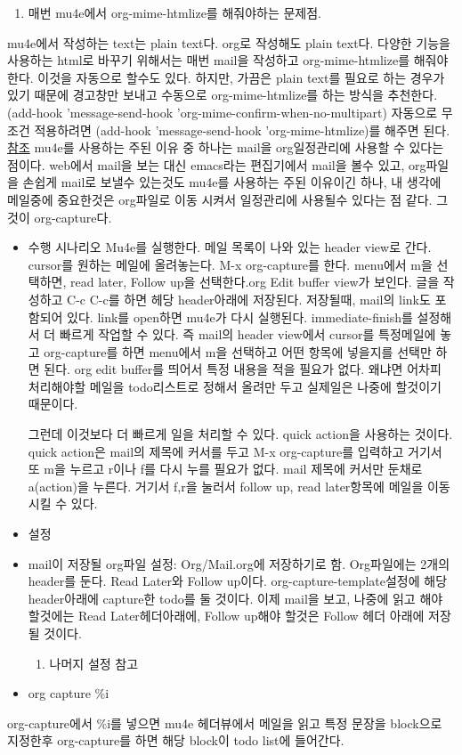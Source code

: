 \documentclass[11pt]{article}
\begin{document}
\begin{enumerate}
\item 매번 mu4e에서 org-mime-htmlize를 해줘야하는 문제점.
\end{enumerate}
mu4e에서 작성하는 text는 plain text다. org로 작성해도 plain
text다. 다양한 기능을 사용하는 html로 바꾸기 위해서는 매번 mail을
작성하고 org-mime-htmlize를 해줘야한다. 이것을 자동으로 할수도
있다. 하지만, 가끔은 plain text를 필요로 하는 경우가 있기 때문에
경고창만 보내고 수동으로 org-mime-htmlize를 하는 방식을 추천한다.
(add-hook 'message-send-hook 'org-mime-confirm-when-no-multipart)
자동으로 무조건 적용하려면 (add-hook 'message-send-hook
'org-mime-htmlize)를 해주면 된다.
\href{https://github.com/daviwil/emacs-from-scratch/blob/master/show-notes/Emacs-Mail-05.org}{참조} mu4e를 사용하는 주된 이유 중 하나는 mail을 org일정관리에 사용할
수 있다는 점이다. web에서 mail을 보는 대신 emacs라는 편집기에서 mail을
볼수 있고, org파일을 손쉽게 mail로 보낼수 있는것도 mu4e를 사용하는
주된 이유이긴 하나, 내 생각에 메일중에 중요한것은 org파일로 이동
시켜서 일정관리에 사용될수 있다는 점 같다. 그것이 org-capture다.

\begin{itemize}
\item 수행 시나리오 Mu4e를 실행한다. 메일 목록이 나와 있는 header view로
간다. cursor를 원하는 메일에 올려놓는다. M-x org-capture를
한다. menu에서 m을 선택하면, read later, Follow up을 선택한다.org
Edit buffer view가 보인다. 글을 작성하고 C-c C-c를 하면 헤당
header아래에 저장된다. 저장될때, mail의 link도 포함되어 있다. link를
open하면 mu4e가 다시 실행된다.  immediate-finish를 설정해서 더
빠르게 작업할 수 있다. 즉 mail의 header view에서 cursor를 특정메일에
놓고 org-capture를 하면 menu에서 m을 선택하고 어떤 항목에 넣을지를
선택만 하면 된다. org edit buffer를 띄어서 특정 내용을 적을 필요가
없다. 왜냐면 어차피 처리해야할 메일을 todo리스트로 정해서 올려만
두고 실제일은 나중에 할것이기 때문이다.

그런데 이것보다 더 빠르게 일을 처리할 수 있다. quick action을
사용하는 것이다.  quick action은 mail의 제목에 커서를 두고 M-x
org-capture를 입력하고 거기서 또 m을 누르고 r이나 f를 다시 누를
필요가 없다. mail 제목에 커서만 둔채로 a(action)을 누른다. 거기서
f,r을 눌러서 follow up, read later항목에 메일을 이동 시킬 수 있다.

\item 설정
\item mail이 저장될 org파일 설정: Org/Mail.org에 저장하기로
함. Org파일에는 2개의 header를 둔다. Read Later와 Follow
up이다. org-capture-template설정에 해당 header아래에 capture한
todo를 둘 것이다. 이제 mail을 보고, 나중에 읽고 해야 할것에는 Read
Later헤더아래에, Follow up해야 할것은 Follow 헤더 아래에 저장될
것이다.

\begin{enumerate}
\item 나머지 설정 참고
\end{enumerate}

\item org capture \%i
\end{itemize}
org-capture에서 \%i를 넣으면 mu4e 헤더뷰에서 메일을 읽고 특정 문장을 block으로 지정한후 org-capture를 하면 해당 block이 todo list에 들어간다.
\end{document}
